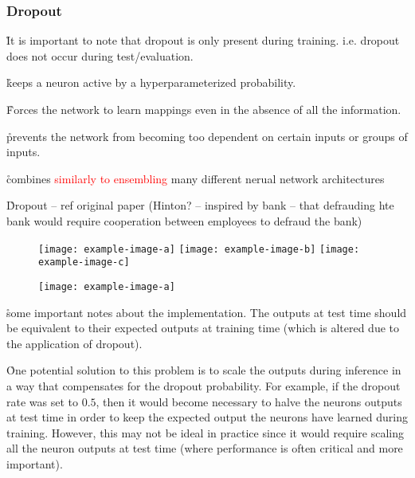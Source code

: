 \subsubsection{Dropout}


\r{It is important to note that dropout is only present during training. i.e. dropout does not occur during test/evaluation.}

\r{keeps a neuron active by a hyperparameterized probability.}

\r{Forces the network to learn mappings even in the absence of all the information.}

\r{prevents the network from becoming too dependent on certain inputs or groups of inputs.}

\r{combines \textcolor{red}{similarly to ensembling} many different nerual network architectures}

\r{Dropout -- ref original paper (Hinton? -- inspired by bank -- that defrauding hte bank would require cooperation between employees to defraud the bank)}


\begin{figure}[htp]
	\centering
	\texttt{[image: example-image-a]}\hfil
	\texttt{[image: example-image-b]}\hfil
	\texttt{[image: example-image-c]}\hfil
	\caption{}
	\label{fig:regularization_dropout_overview_training}
\end{figure}

\begin{figure}[htp]
	\centering
	\texttt{[image: example-image-a]}\hfil
	\caption{}
	\label{fig:regularization_dropout_overview_test}
\end{figure}

\r{some important notes about the implementation. The outputs at test time should be equivalent to their expected outputs at training time (which is altered due to the application of dropout).}

\r{One potential solution to this problem is to scale the outputs during inference in a way that compensates for the dropout probability.  For example, if the dropout rate was set to $0.5$, then it would become necessary to halve the neurons outputs at test time in order to keep the expected output the neurons have learned during training.  However, this may not be ideal in practice since it would require scaling all the neuron outputs at test time (where performance is often critical and more important).}

